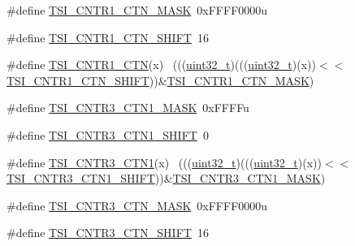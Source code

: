 \begin{DoxyCompactItemize}
\item 
\#define \hyperlink{group___t_s_i___register___masks_ga5c1efa805b567ae0b51c7b93c396afd5}{T\+S\+I\+\_\+\+C\+N\+T\+R1\+\_\+\+C\+T\+N\+\_\+\+M\+A\+SK}~0x\+F\+F\+F\+F0000u
\item 
\#define \hyperlink{group___t_s_i___register___masks_gafaa522509f837ff019a51e3c70e44261}{T\+S\+I\+\_\+\+C\+N\+T\+R1\+\_\+\+C\+T\+N\+\_\+\+S\+H\+I\+FT}~16
\item 
\#define \hyperlink{group___t_s_i___register___masks_ga7136c31bbd395dd222bff4c650e768dc}{T\+S\+I\+\_\+\+C\+N\+T\+R1\+\_\+\+C\+TN}(x)                                              ~(((\hyperlink{_p_e___types_8h_a33594304e786b158f3fb30289278f5af}{uint32\+\_\+t})(((\hyperlink{_p_e___types_8h_a33594304e786b158f3fb30289278f5af}{uint32\+\_\+t})(x))$<$$<$\hyperlink{group___t_s_i___register___masks_gafaa522509f837ff019a51e3c70e44261}{T\+S\+I\+\_\+\+C\+N\+T\+R1\+\_\+\+C\+T\+N\+\_\+\+S\+H\+I\+FT}))\&\hyperlink{group___t_s_i___register___masks_ga5c1efa805b567ae0b51c7b93c396afd5}{T\+S\+I\+\_\+\+C\+N\+T\+R1\+\_\+\+C\+T\+N\+\_\+\+M\+A\+SK})
\item 
\#define \hyperlink{group___t_s_i___register___masks_ga944c52b8a9c3019342c1c27eb7ab5d1f}{T\+S\+I\+\_\+\+C\+N\+T\+R3\+\_\+\+C\+T\+N1\+\_\+\+M\+A\+SK}~0x\+F\+F\+F\+Fu
\item 
\#define \hyperlink{group___t_s_i___register___masks_ga40857a8de39e7f24268f2209546b7d92}{T\+S\+I\+\_\+\+C\+N\+T\+R3\+\_\+\+C\+T\+N1\+\_\+\+S\+H\+I\+FT}~0
\item 
\#define \hyperlink{group___t_s_i___register___masks_ga1e6f0a4e5556aaf6a47e0c4b09abcdf8}{T\+S\+I\+\_\+\+C\+N\+T\+R3\+\_\+\+C\+T\+N1}(x)                                            ~(((\hyperlink{_p_e___types_8h_a33594304e786b158f3fb30289278f5af}{uint32\+\_\+t})(((\hyperlink{_p_e___types_8h_a33594304e786b158f3fb30289278f5af}{uint32\+\_\+t})(x))$<$$<$\hyperlink{group___t_s_i___register___masks_ga40857a8de39e7f24268f2209546b7d92}{T\+S\+I\+\_\+\+C\+N\+T\+R3\+\_\+\+C\+T\+N1\+\_\+\+S\+H\+I\+FT}))\&\hyperlink{group___t_s_i___register___masks_ga944c52b8a9c3019342c1c27eb7ab5d1f}{T\+S\+I\+\_\+\+C\+N\+T\+R3\+\_\+\+C\+T\+N1\+\_\+\+M\+A\+SK})
\item 
\#define \hyperlink{group___t_s_i___register___masks_ga706c452af2d87895eec6b24787418763}{T\+S\+I\+\_\+\+C\+N\+T\+R3\+\_\+\+C\+T\+N\+\_\+\+M\+A\+SK}~0x\+F\+F\+F\+F0000u
\item 
\#define \hyperlink{group___t_s_i___register___masks_ga7b5cdf80f7cb214a07cc1a08f84dafde}{T\+S\+I\+\_\+\+C\+N\+T\+R3\+\_\+\+C\+T\+N\+\_\+\+S\+H\+I\+FT}~16

\end{DoxyCompactItemize}
